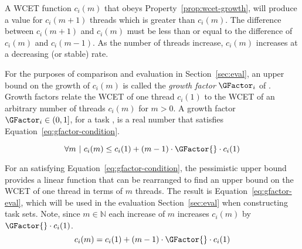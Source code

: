 A WCET function ${c_i(m)}$ that obeys Property~\ref{prop:wcet-growth},
will produce a value for ${c_i(m+1)}$ threads which is greater than
${c_i(m)}$. The difference between ${c_i(m+1)}$ and ${c_i(m)}$ must be less
than or equal to the difference of ${c_i(m)}$ and ${c_i(m-1)}$. As the
number of threads increase, ${c_i(m)}$ increases at a decreasing (or
stable) rate. 

For the purposes of comparison and evaluation in
Section~\ref{sec:eval}, an upper bound on the growth of ${c_i(m)}$
is called the \emph{growth factor} ${\GFactor_i{}}$ of . 
Growth factors relate the WCET of one thread ${c_i(1)}$ to 
the WCET of an arbitrary number of threads ${c_i(m)}$ for ${m > 0}$.
A growth factor ${\GFactor_i{} \in (0,1]}$, for a task , is a
real number that satisfies Equation~\ref{eq:gfactor-condition}.  

\begin{definition}
  \begin{equation}
    \label{eq:gfactor-condition}
    \forall{m}~|~ c_i(m) \le c_i(1) + (m - 1) \cdot \GFactor{} \cdot c_i(1)
  \end{equation}
\end{definition}

For an \GFactor{} satisfying Equation~\ref{eq:gfactor-condition}, the
pessimistic upper bound provides a linear function that can be
rearranged to find an upper bound on the WCET of one thread in terms
of ${m}$ threads. 
The result is Equation~\ref{eq:gfactor-eval}, which will be
used in the evaluation Section~\ref{sec:eval} when constructing
task sets. Note, since ${m \in \mathbb{N}}$ each increase of ${m}$ 
increases ${c_i(m)}$ by ${\GFactor{} \cdot c_i(1)}$.
\begin{equation}
  \label{eq:gfactor-eval}
  c_i(m) = c_i(1) + (m - 1) \cdot \GFactor{} \cdot c_i(1)
\end{equation}
